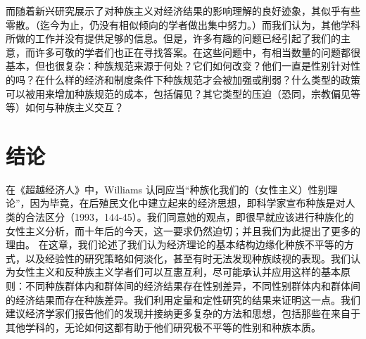 \documentclass[UTF8]{ctexart}
\begin{document}
而随着新兴研究展示了对种族主义对经济结果的影响理解的良好迹象，其似乎有些零散。（迄今为止，仍没有相似倾向的学者做出集中努力。）而我们认为，其他学科所做的工作并没有提供足够的信息。但是，许多有趣的问题已经引起了我们的主意，而许多可敬的学者们也正在寻找答案。在这些问题中，有相当数量的问题都很基本，但也很复杂：种族规范来源于何处？它们如何改变？他们一直是性别针对性的吗？在什么样的经济和制度条件下种族规范才会被加强或削弱？什么类型的政策可以被用来增加种族规范的成本，包括偏见？其它类型的压迫（恐同，宗教偏见等等）如何与种族主义交互？

\section{结论}在《超越经济人》中，Williams 认同应当“种族化我们的（女性主义）性别理论”，因为毕竟，在后殖民文化中建立起来的经济思想，即科学家宣布种族是对人类的合法区分（1993，144-45）。我们同意她的观点，即很早就应该进行种族化的女性主义分析，而十年后的今天，这一要求仍然迫切；并且我们为此提出了更多的理由。
在这章，我们论述了我们认为经济理论的基本结构边缘化种族不平等的方式，以及经验性的研究策略如何淡化，甚至有时无法发现种族歧视的表现。我们认为女性主义和反种族主义学者们可以互惠互利，尽可能承认并应用这样的基本原则：不同种族群体内和群体间的经济结果存在性别差异，不同性别群体内和群体间的经济结果而存在种族差异。我们利用定量和定性研究的结果来证明这一点。我们建议经济学家们报告他们的发现并接纳更多复杂的方法和思想，包括那些在来自于其他学科的，无论如何这都有助于他们研究极不平等的性别和种族本质。
\end{document}
